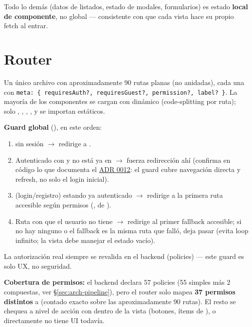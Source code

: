 Todo lo demás (datos de listados, estado de modales, formularios) es estado \textbf{local de componente}, no global --- consistente con que cada vista hace su propio fetch al entrar.

\section{Router}
\label{sec:frontend-router}

Un único archivo  con aproximadamente 90 rutas planas (no anidadas), cada una con \texttt{meta: \{ requiresAuth?, requiresGuest?, permission?, label? \}}. La mayoría de los componentes se cargan con  dinámico (code-splitting por ruta); solo , , , , \allowbreak {}\allowbreak {} y  se importan estáticos.

\textbf{Guard global} (), en este orden:
\begin{enumerate}
  \item {} sin sesión $\rightarrow$ redirige a .
  \item Autenticado con  y no está ya en \code{/}\allowbreak {} $\rightarrow$ fuerza redirección ahí (confirma en código lo que documenta el \hyperref[adr:0012]{ADR 0012}: el guard cubre navegación directa y refresh, no solo el login inicial).
  \item {} (login/registro) estando ya autenticado $\rightarrow$ redirige a la primera ruta accesible según permisos (\allowbreak {}\allowbreak {}, de \allowbreak {}\allowbreak {}).
  \item Ruta con  que el usuario no tiene $\rightarrow$ redirige al primer fallback accesible; si no hay ninguno o el fallback es la misma ruta que falló, deja pasar (evita loop infinito; la vista debe manejar el estado vacío).
\end{enumerate}

La autorización real siempre se revalida en el backend (policies) --- este guard es solo UX, no seguridad.

\textbf{Cobertura de permisos:} el backend declara 57 policies (55 simples más 2 compuestas, ver \S\ref{sec:arch-pipeline}), pero el router solo mapea \textbf{37 permisos distintos} a  (contado exacto sobre las aproximadamente 90 rutas). El resto se chequea a nivel de acción con \allowbreak {}\allowbreak {}\allowbreak {}\allowbreak \code{)} dentro de la vista (botones, ítems de ), o directamente no tiene UI todavía.

